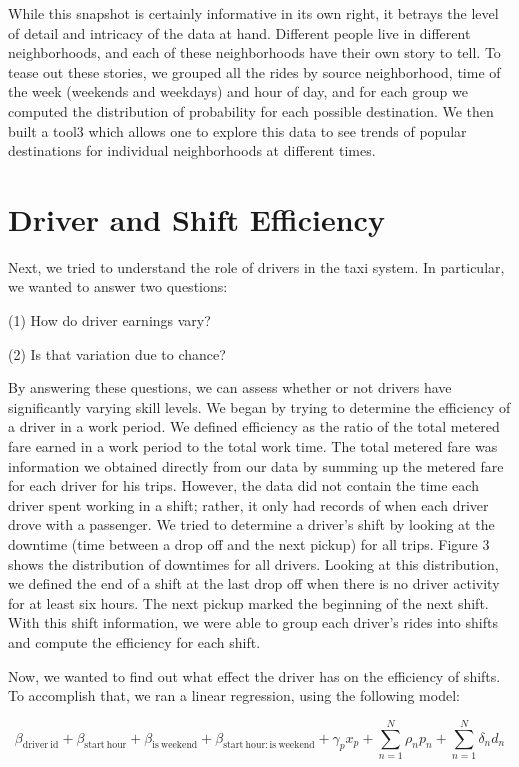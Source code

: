 \documentclass[]{article}
\begin{document}
\begin{multicols}{2}
{}

While this snapshot is certainly informative in its own right, it betrays the level of detail and intricacy of the data at hand. Different people live in different neighborhoods, and each of these neighborhoods have their own story to tell. To tease out these stories, we grouped all the rides by source neighborhood, time of the week (weekends and weekdays) and hour of day, and for each group we computed the distribution of probability for each possible destination. We then built a tool3 which allows one to explore this data to see trends of popular destinations for individual neighborhoods at different times. 
\section{Driver and Shift Efficiency}
Next, we tried to understand the role of drivers in the taxi system. In particular, we wanted to answer two questions:

(1) How do driver earnings vary?

(2) Is that variation due to chance?

By answering these questions, we can assess whether or not drivers have significantly varying skill levels. We began by trying to determine the efficiency of a driver in a work period. We defined efficiency as the ratio of the total metered fare earned in a work period to the total work time. The total metered fare was information we obtained directly from our data by summing up the metered fare for each driver for his trips. However, the data did not contain the time each driver spent working in a shift; rather, it only had records of when each driver drove with a passenger. We tried to determine a driver's shift by looking at the downtime (time between a drop off and the next pickup) for all trips. Figure 3 shows the distribution of downtimes for all drivers. 
Looking at this distribution, we defined the end of a shift at the last drop off when there is no driver activity for at least six hours. The next pickup marked the beginning of the next shift. With this shift information, we were able to group each driver's rides into shifts and compute the efficiency for each shift.

Now, we wanted to find out what effect the driver has on the efficiency of shifts. To accomplish that, we ran a linear regression, using the following model: 
\end{multicols}
\begin{equation}
\beta_{\mathrm{driver~id}} + \beta_{\mathrm{start~hour}} + \beta_{\mathrm{is~weekend}} + \beta_{\mathrm{start~hour:is~weekend}} + \gamma_p x_p + \sum_{n=1}^N \rho_n p_n + \sum_{n=1}^N \delta_n d_n	
\end{equation}	
\end{document}
